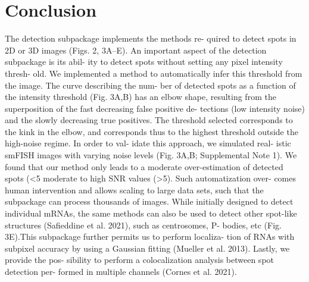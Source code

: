 \section{Conclusion} \label{sec:detection_conclusion}

The detection subpackage implements the methods re- quired to detect spots in
2D or 3D images (Figs. 2, 3A–E). An important aspect of the detection subpackage
is its abil- ity to detect spots without setting any pixel intensity thresh- old.
We implemented a method to automatically infer this threshold from the image.
The curve describing the num- ber of detected spots as a function of the
intensity threshold (Fig. 3A,B) has an elbow shape, resulting from the superposition
of the fast decreasing false positive de- tections (low intensity noise) and the
slowly decreasing true positives. The threshold selected corresponds to the kink
in the elbow, and corresponds thus to the highest threshold outside the high-noise
regime. In order to val- idate this approach, we simulated real- istic smFISH images
with varying noise levels (Fig. 3A,B; Supplemental Note 1). We found that our method
only leads to a moderate over-estimation of detected spots (<5%
moderate to high SNR values (>5). Such automatization over- comes human intervention
and allows scaling to large data sets, such that the subpackage can process thousands
of images. While initially designed to detect individual mRNAs, the same methods
can also be used to detect other spot-like structures (Safieddine et al. 2021),
such as centrosomes, P- bodies, etc (Fig. 3E).This subpackage further permits us
to perform localiza- tion of RNAs with subpixel accuracy by using a Gaussian
fitting (Mueller et al. 2013). Lastly, we provide the pos- sibility to perform
a colocalization analysis between spot detection per- formed in multiple channels (Cornes et al. 2021).

